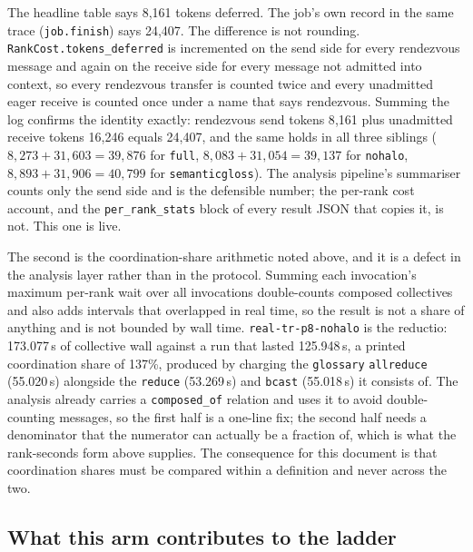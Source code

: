 \documentclass[11pt]{article}
\begin{document}
The headline table says 8{,}161 tokens deferred. The job's own record in the same trace
(\texttt{job.finish}) says 24{,}407. The difference is not rounding.
\texttt{RankCost.tokens\_deferred} is incremented on the send side for every rendezvous message
and again on the receive side for every message not admitted into context, so every rendezvous
transfer is counted twice and every unadmitted eager receive is counted once under a name that
says rendezvous. Summing the log confirms the identity exactly: rendezvous send tokens 8{,}161
plus unadmitted receive tokens 16{,}246 equals 24{,}407, and the same holds in all three siblings
($8{,}273 + 31{,}603 = 39{,}876$ for \texttt{full}, $8{,}083 + 31{,}054 = 39{,}137$ for
\texttt{nohalo}, $8{,}893 + 31{,}906 = 40{,}799$ for \texttt{semanticgloss}). The analysis
pipeline's summariser counts only the send side and is the defensible number; the per-rank cost
account, and the \texttt{per\_rank\_stats} block of every result JSON that copies it, is not. This
one is live.

The second is the coordination-share arithmetic noted above, and it is a defect in the analysis
layer rather than in the protocol. Summing each invocation's maximum per-rank wait over all
invocations double-counts composed collectives and also adds intervals that overlapped in real
time, so the result is not a share of anything and is not bounded by wall time.
\texttt{real-tr-p8-nohalo} is the reductio: 173.077\,s of collective wall against a run that
lasted 125.948\,s, a printed coordination share of 137\%, produced by charging the
\texttt{glossary} \texttt{allreduce} (55.020\,s) alongside the \texttt{reduce} (53.269\,s) and
\texttt{bcast} (55.018\,s) it consists of. The analysis already carries a \texttt{composed\_of}
relation and uses it to avoid double-counting messages, so the first half is a one-line fix; the
second half needs a denominator that the numerator can actually be a fraction of, which is what
the rank-seconds form above supplies. The consequence for this document is that coordination
shares must be compared within a definition and never across the two.

\subsection*{What this arm contributes to the ladder}
\end{document}
